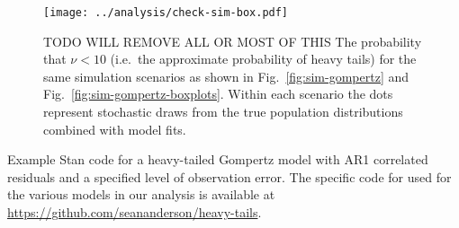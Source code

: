 \clearpage


\clearpage

\begin{figure}[htbp]
\begin{center}
\texttt{[image: ../analysis/check-sim-box.pdf]}
\caption{
TODO WILL REMOVE ALL OR MOST OF THIS
  The probability that $\nu < 10$ (i.e.\ the approximate probability of heavy
  tails) for the same simulation scenarios as shown in
  Fig.~\ref{fig:sim-gompertz} and Fig.~\ref{fig:sim-gompertz-boxplots}. Within
  each scenario the dots represent stochastic draws from the true population
  distributions combined with model fits.
}
\label{fig:sim-prob}
\end{center}
\end{figure}

\clearpage

\noindent
Example Stan code for a heavy-tailed Gompertz model with AR1 correlated
residuals and a specified level of observation error. The specific code for used for the various models in our analysis is available at \url{https://github.com/seananderson/heavy-tails}.

